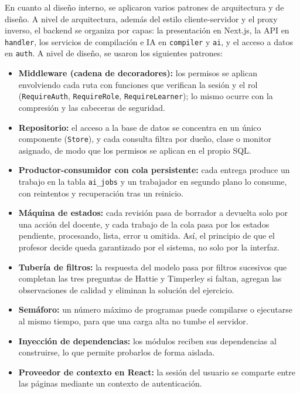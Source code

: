 \documentclass[letterpaper, 10 pt, conference]{ieeeconf}
\begin{document}
En cuanto al diseño interno, se aplicaron varios patrones de arquitectura y de diseño.
A nivel de arquitectura, además del estilo cliente-servidor y el proxy inverso, el backend se organiza por capas: la presentación en Next.js, la API en \texttt{handler}, los servicios de compilación e IA en \texttt{compiler} y \texttt{ai}, y el acceso a datos en \texttt{auth}.
A nivel de diseño, se usaron los siguientes patrones:
\begin{itemize}
  \item \textbf{Middleware (cadena de decoradores):} los permisos se aplican envolviendo cada ruta con funciones que verifican la sesión y el rol (\texttt{RequireAuth}, \texttt{RequireRole}, \texttt{RequireLearner}); lo mismo ocurre con la compresión y las cabeceras de seguridad.
  \item \textbf{Repositorio:} el acceso a la base de datos se concentra en un único componente (\texttt{Store}), y cada consulta filtra por dueño, clase o monitor asignado, de modo que los permisos se aplican en el propio SQL.
  \item \textbf{Productor-consumidor con cola persistente:} cada entrega produce un trabajo en la tabla \texttt{ai\_jobs} y un trabajador en segundo plano lo consume, con reintentos y recuperación tras un reinicio.
  \item \textbf{Máquina de estados:} cada revisión pasa de borrador a devuelta solo por una acción del docente, y cada trabajo de la cola pasa por los estados pendiente, procesando, lista, error u omitida. Así, el principio de que el profesor decide queda garantizado por el sistema, no solo por la interfaz.
  \item \textbf{Tubería de filtros:} la respuesta del modelo pasa por filtros sucesivos que completan las tres preguntas de Hattie y Timperley si faltan, agregan las observaciones de calidad y eliminan la solución del ejercicio.
  \item \textbf{Semáforo:} un número máximo de programas puede compilarse o ejecutarse al mismo tiempo, para que una carga alta no tumbe el servidor.
  \item \textbf{Inyección de dependencias:} los módulos reciben sus dependencias al construirse, lo que permite probarlos de forma aislada.
  \item \textbf{Proveedor de contexto en React:} la sesión del usuario se comparte entre las páginas mediante un contexto de autenticación.
\end{itemize}
\end{document}
